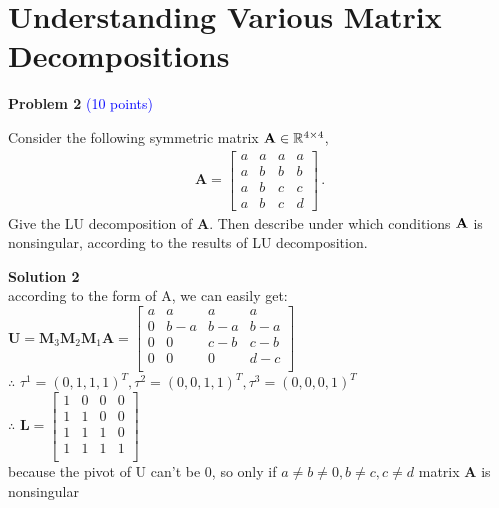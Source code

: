 \documentclass[english,onecolumn]{IEEEtran}
\begin{document}
\newpage
\section{Understanding Various Matrix Decompositions}
\noindent\textbf{Problem 2} \textcolor{blue}{(10 points)}

\noindent Consider the following symmetric matrix ${\bf A}\in \mathbb{R}^{4\times 4}$,
	\begin{align*}
		\mathbf{A}=
		\begin{bmatrix}
			a&a&a&a\\
			a&b&b&b\\
			a&b&c&c\\
			a&b&c&d
		\end{bmatrix}\,.
	\end{align*}
Give the LU decomposition of $\mathbf{A}$.
Then describe under which conditions $\bf{A}$ is nonsingular, according to the results of LU decomposition.

\noindent \textbf{Solution 2}\\
according to the form of A, we can easily get:
$\mathbf{U}=\mathbf{M}_{3}\mathbf{M}_{2}\mathbf{M}_{1}\mathbf{A}=
	\begin{bmatrix}
		a & a & a & a\\
		0 & b-a & b-a & b-a\\
		0 & 0 & c-b & c-b\\
		0 & 0 & 0 & d-c\\
	\end{bmatrix}$\\
$\therefore$ $\tau^1=(0,1,1,1)^T,\tau^2=(0,0,1,1)^T,\tau^3=(0,0,0,1)^T$\\
$\therefore$ $\mathbf{L}=
	\begin{bmatrix}
		1 & 0 & 0 & 0\\
		1 & 1 & 0 & 0\\
		1 & 1 & 1 & 0\\
		1 & 1 & 1 & 1\\
	\end{bmatrix}$\\
because the pivot of U can't be 0, so only if $a\ne b \ne 0,b \ne c,c \ne d$ matrix $\mathbf{A}$ is nonsingular
\end{document}
